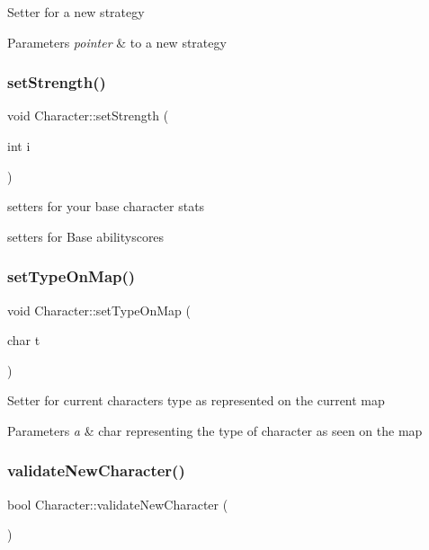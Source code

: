Setter for a new strategy 
\begin{DoxyParams}{Parameters}
{\em pointer} & to a new strategy \\
\hline
\end{DoxyParams}
\hypertarget{classCharacter_afb85385ddf9ea03258e3df50184606bd}{}\label{classCharacter_afb85385ddf9ea03258e3df50184606bd} 
\subsubsection{\texorpdfstring{set\+Strength()}{setStrength()}}
{\footnotesize\ttfamily void Character\+::set\+Strength (\begin{DoxyParamCaption}\item[{int}]{i }\end{DoxyParamCaption})}



setters for your base character stats 

setters for Base abilityscores \hypertarget{classCharacter_a509659845edbecfe7806ca1606ec8f18}{}\label{classCharacter_a509659845edbecfe7806ca1606ec8f18} 
\subsubsection{\texorpdfstring{set\+Type\+On\+Map()}{setTypeOnMap()}}
{\footnotesize\ttfamily void Character\+::set\+Type\+On\+Map (\begin{DoxyParamCaption}\item[{char}]{t }\end{DoxyParamCaption})}

Setter for current character\textquotesingle{}s type as represented on the current map 
\begin{DoxyParams}{Parameters}
{\em a} & char representing the type of character as seen on the map \\
\hline
\end{DoxyParams}
\hypertarget{classCharacter_adae2bb0e0bb6b8d010be6d1ac3b1fd5f}{}\label{classCharacter_adae2bb0e0bb6b8d010be6d1ac3b1fd5f} 
\subsubsection{\texorpdfstring{validate\+New\+Character()}{validateNewCharacter()}}
{\footnotesize\ttfamily bool Character\+::validate\+New\+Character (\begin{DoxyParamCaption}{ }\end{DoxyParamCaption})}

